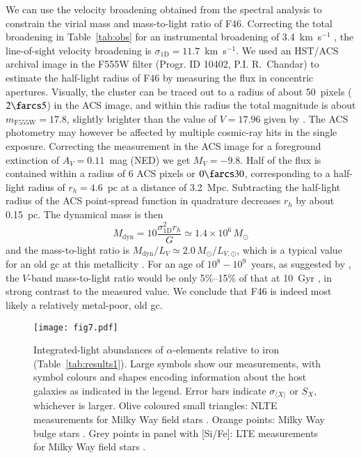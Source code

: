\documentclass{aa}
\begin{document}
We can use the velocity broadening obtained from the spectral analysis to constrain the virial mass and mass-to-light ratio of F46. Correcting the total broadening in Table~\ref{tab:obs} for an instrumental broadening of 3.4~km~s$^{-1}$ \citep{Larsen2020}, the line-of-sight velocity broadening is $\sigma_\mathrm{1D}=11.7$~km~s$^{-1}$. We used an HST/ACS archival image in the F555W filter (Progr. ID 10402, P.I. R.\ Chandar) to estimate the half-light radius of F46 by measuring the flux in concentric apertures. 
Visually, the cluster can be traced out to a radius of about 50~pixels ($2\farcs5$) in the ACS image, and within this radius the total magnitude is about $m_\mathrm{F555W} = 17.8$, slightly brighter than the value of $V=17.96$ given by \citet{Battistini1984}. The ACS photometry may however be affected by multiple cosmic-ray hits in the single exposure. 
Correcting the measurement in the ACS image for a foreground extinction of $A_V=0.11$~mag (NED) we get $M_V=-9.8$.
Half of the flux is contained within a radius of 6 ACS pixels or $0\farcs30$, corresponding to a half-light radius of $r_h=4.6$~pc at a distance of 3.2~Mpc. Subtracting the half-light radius of the ACS point-spread function \citep[about 1.5 pixels;][]{Bohlin2016} in quadrature decreases $r_h$ by about 0.15~pc. The dynamical mass is then
%
\begin{equation}
    M_\mathrm{dyn} = 10 \frac{\sigma_\mathrm{1D}^2 r_h}{G} \simeq 1.4\times10^6 \, M_\odot
\end{equation}
%
and the mass-to-light ratio is $M_\mathrm{dyn}/L_V \simeq 2.0 \, M_\odot/L_{V,\odot}$, which is a typical value for an old \ac{gc} at this metallicity \citep{Strader2011}. For an age of $10^8-10^9$~years, as suggested by \citet{Battistini1984}, the $V$-band mass-to-light ratio would be only 5\%--15\% of that at 10~Gyr \citep[e.g.][]{Bruzual2003}, in strong contrast to the measured value.
We conclude that F46 is indeed most likely a relatively metal-poor, old \ac{gc}. 


\begin{figure}
\centering
\texttt{[image: fig7.pdf]}
\caption{\label{fig:alphafe}Integrated-light abundances of $\alpha$-elements relative to iron (Table~\ref{tab:results1}). Large symbols show our measurements, with symbol colours and shapes encoding information about the host galaxies as indicated in the legend.
Error bars indicate $\sigma_{\langle X \rangle}$ or $S_X$, whichever is larger.
Olive coloured small triangles: NLTE measurements for Milky Way field stars \citep{Bergemann2017,Mashonkina2017,Mashonkina2019,Mishenina2017,Zhao2016}. Orange points: Milky Way bulge stars \citep{Bensby2017}.
Grey points in panel with [Si/Fe]: LTE measurements for Milky Way field stars \citep{Suda2008}.
}
\end{figure}
\end{document}
